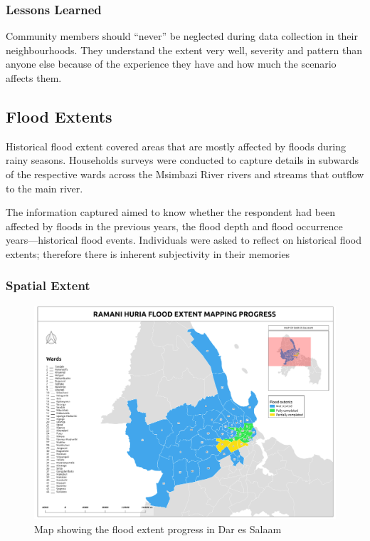 \documentclass[a4paper,12pt,twoside]{article}
\begin{document}
\subsubsection{Lessons Learned}
Community members should “never” be neglected during data collection in their neighbourhoods. They understand the extent very well, severity and pattern than anyone else because of the experience they have and how much the scenario affects them.

\newpage
\subsection{Flood Extents}

Historical flood extent covered areas that are mostly affected by floods during rainy seasons. Households surveys were conducted to capture details in  subwards of the respective wards across the Msimbazi River rivers and streams that outflow to the main river.

\medskip

The information captured aimed to know whether the respondent had been affected by floods in the previous years, the flood depth and flood occurrence years---historical flood events. Individuals were asked to reflect on historical flood extents; therefore there is inherent subjectivity in their memories

\subsubsection{Spatial Extent}
\begin{figure}[h]
  \color{RHgreen}\caption{Map showing the flood extent progress in Dar es Salaam}
  \centering
  \includegraphics[width=1\textwidth]{images/RH_Flood_Extent_Progress.png}
\end{figure}
\end{document}

